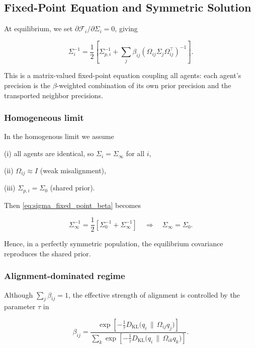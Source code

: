 \documentclass[11pt]{article}
\begin{document}
\subsection{Fixed-Point Equation and Symmetric Solution}

At equilibrium, we set $\partial \mathcal{F}_i / \partial \Sigma_i = 0$, giving

\begin{equation}
\Sigma_i^{-1}
=\frac{1}{2}
\left[
\Sigma_{p,i}^{-1}
+ \sum_j \beta_{ij}
(\Omega_{ij}\Sigma_j\Omega_{ij}^\top)^{-1}
\right].
\label{eq:sigma_fixed_point_beta}
\end{equation}

This is a matrix-valued fixed-point equation coupling all agents: each agent’s precision is the $\beta$-weighted combination of its own prior precision and the transported neighbor precisions.

\subsubsection{Homogeneous limit}

In the homogenous limit we assume 

(i) all agents are identical, so $\Sigma_i = \Sigma_\infty$ for all $i$,

(ii) $\Omega_{ij} \approx I$ (weak misalignment),

(iii) $\Sigma_{p,i} = \Sigma_0$ (shared prior).

Then \eqref{eq:sigma_fixed_point_beta} becomes

\begin{equation}
\Sigma_\infty^{-1}
=\frac{1}{2}
\left[
\Sigma_0^{-1}
+ \Sigma_\infty^{-1}
\right]
\quad\Longrightarrow\quad
\Sigma_\infty = \Sigma_0.
\end{equation}

Hence, in a perfectly symmetric population, the equilibrium covariance reproduces the shared prior.

\subsubsection{Alignment-dominated regime}

Although $\sum_j \beta_{ij} = 1$, the effective strength of alignment is controlled by the parameter $\tau$ in

\begin{equation}
\beta_{ij}
=\frac{
\exp\!\left[
-\frac{1}{\tau}
D_{\mathrm{KL}}\!\big(q_i \,\|\, \Omega_{ij} q_j\big)
\right]
}{\sum_k
\exp\!\left[
-\frac{1}{\tau}
D_{\mathrm{KL}}\!\big(q_i \,\|\, \Omega_{ik} q_k\big)
\right]}.
\end{equation}
\end{document}
